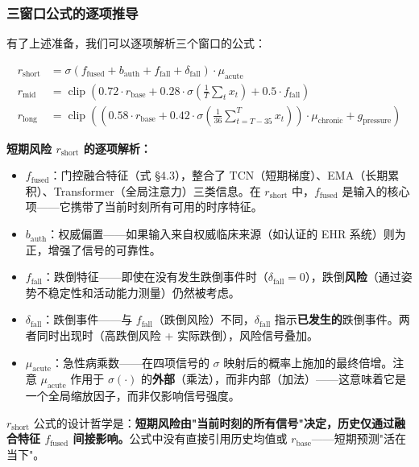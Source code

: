 \documentclass[11pt,a4paper]{ctexart}
\theoremstyle{remark}
\DeclareMathOperator{\clip}{clip}
\begin{document}
\subsubsection{三窗口公式的逐项推导}

有了上述准备，我们可以逐项解析三个窗口的公式：

\begin{align}
r_{\text{short}} &= \sigma\left(f_{\text{fused}} + b_{\text{auth}} + f_{\text{fall}} + \delta_{\text{fall}}\right) \cdot \mu_{\text{acute}} \\
r_{\text{mid}} &= \clip\left(0.72 \cdot r_{\text{base}} + 0.28 \cdot \sigma\left(\frac{1}{T}\sum_t x_t\right) + 0.5 \cdot f_{\text{fall}}\right) \\
r_{\text{long}} &= \clip\left(\left(0.58 \cdot r_{\text{base}} + 0.42 \cdot \sigma\left(\frac{1}{36}\sum_{t=T-35}^{T} x_t\right)\right) \cdot \mu_{\text{chronic}} + g_{\text{pressure}}\right)
\end{align}

\textbf{短期风险 $r_{\text{short}}$ 的逐项解析：}
\begin{itemize}[nosep]
\item $f_{\text{fused}}$：门控融合特征（式 §4.3），整合了 TCN（短期梯度）、EMA（长期累积）、Transformer（全局注意力）三类信息。在 $r_{\text{short}}$ 中，$f_{\text{fused}}$ 是输入的核心项——它携带了当前时刻所有可用的时序特征。
\item $b_{\text{auth}}$：权威偏置——如果输入来自权威临床来源（如认证的 EHR 系统）则为正，增强了信号的可靠性。
\item $f_{\text{fall}}$：跌倒特征——即使在没有发生跌倒事件时（$\delta_{\text{fall}} = 0$），跌倒\textbf{风险}（通过姿势不稳定性和活动能力测量）仍然被考虑。
\item $\delta_{\text{fall}}$：跌倒事件——与 $f_{\text{fall}}$（跌倒风险）不同，$\delta_{\text{fall}}$ 指示\textbf{已发生的}跌倒事件。两者同时出现时（高跌倒风险 + 实际跌倒），风险信号叠加。
\item $\mu_{\text{acute}}$：急性病乘数——在四项信号的 $\sigma$ 映射后的概率上施加的最终倍增。注意 $\mu_{\text{acute}}$ 作用于 $\sigma(\cdot)$ 的\textbf{外部}（乘法），而非内部（加法）——这意味着它是一个全局缩放因子，而非仅影响信号强度。
\end{itemize}
$r_{\text{short}}$ 公式的设计哲学是：\textbf{短期风险由"当前时刻的所有信号"决定，历史仅通过融合特征 $f_{\text{fused}}$ 间接影响。}公式中没有直接引用历史均值或 $r_{\text{base}}$——短期预测"活在当下"。
\end{document}
